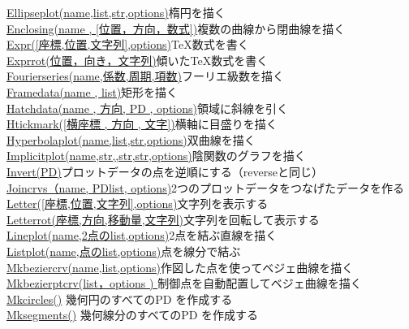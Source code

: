 \documentclass[papersize,a4paper,12pt,uplatex]{jsarticle}
\begin{document}
\begin{tabbing}
\hyperlink{ellipseplot}{Ellipseplot(name,list,str,options)}\>楕円を描く\\
\hyperlink{enclosing}{Enclosing(name , [位置，方向，数式])}\>複数の曲線から閉曲線を描く\\
\hyperlink{expr}{Expr([座標,位置,文字列],options)}\>\TeX 数式を書く\\
\hyperlink{exprrot}{Exprrot(位置，向き，文字列)}\>傾いた\TeX 数式を書く\\
\hyperlink{fourierseries}{Fourierseries(name,係数,周期,項数)}\>フーリエ級数を描く\\
\hyperlink{framedata}{Framedata(name , list)}\>矩形を描く\\
\hyperlink{hatchdata}{Hatchdata(name , 方向, PD , options)}\>領域に斜線を引く\\
\hyperlink{htickmark}{Htickmark([横座標 , 方向 , 文字])}\>横軸に目盛りを描く\\
\hyperlink{hyperbolaplot}{Hyperbolaplot(name,list,str,options)}\>双曲線を描く\\
\hyperlink{implicitplot}{Implicitplot(name,str,,str,str,options)}\>陰関数のグラフを描く\\
\hyperlink{invert}{Invert(PD)}\>プロットデータの点を逆順にする（reverseと同じ）\\
\hyperlink{joincrvs}{Joincrvs（name, PDlist, options)}\>2つのプロットデータをつなげたデータを作る\\
\hyperlink{letter}{Letter([座標,位置,文字列],options)}\>文字列を表示する\\
\hyperlink{letterrot}{Letterrot(座標,方向,移動量,文字列)}\>文字列を回転して表示する\\
\hyperlink{lineplot}{Lineplot(name,2点のlist,options)}\>2点を結ぶ直線を描く\\
\hyperlink{listplot}{Listplot(name,点のlist,options)}\>点を線分で結ぶ\\
\hyperlink{mkbeziercrv}{Mkbeziercrv(name,list,options)}\>作図した点を使ってベジェ曲線を描く\\
\hyperlink{mkbezierptcrv}{Mkbezierptcrv(list，options ) } \>制御点を自動配置してベジェ曲線を描く\\
\hyperlink{mkcircles}{Mkcircles()} \>幾何円のすべてのPD を作成する\\
\hyperlink{mksegments}{Mksegments()}\> 幾何線分のすべてのPD を作成する\\

\end{tabbing}
\end{document}
